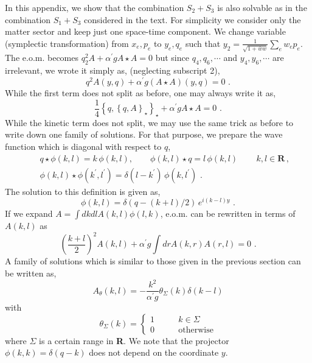 \documentclass[a4paper,aps,preprint,nofootinbib,eqsecnum]{revtex4}
\begin{document}
\label{s:particle_limit}
In this appendix, we show that the combination $S_2+S_3$ is also solvable as
in the combination $S_1+S_3$ considered in the text. For simplicity we
consider only the matter sector and keep just one space-time component. We
change variable (symplectic transformation) from $x_e,p_e$ to $y_e,q_e$ such
that $y_2=\frac{1}{\sqrt{1+\bar w w}}\sum_e w_e p_e$. The e.o.m. becomes $%
q_2^2A+{\alpha^{\prime}} g A\star A=0$ but since $q_4, q_6,\cdots$ and $y_4,
y_6,\cdots$ are irrelevant, we wrote it simply as, (neglecting subscript 2),
\begin{equation}
q^2A(y,q)+{\alpha^{\prime}} g (A\star A)(y,q)=0\,\,.
\end{equation}
While the first term does not split as before, one may always write it as,
\begin{equation}
\frac{1}{4}\left\{q,\left\{q,A\right\}_\star\right\}_\star +{\alpha^{\prime}}
g A\star A=0\,\,.
\end{equation}
While the kinetic term does not split, we may use the same trick as before
to write down one family of solutions. For that purpose, we prepare the wave
function which is diagonal with respect to $q$,
\begin{eqnarray}
&&q\star\phi(k,l)=k \,\phi(k,l),\qquad \phi(k,l)\star q=l
\,\phi(k,l)\,\qquad k,l\in{\mathbf{R}} \,, \\
&& \phi(k,l)\star
\phi(k^{\prime},l^{\prime})=\delta(l-k^{\prime})\,\phi(k,l^{\prime})\,\,.
\end{eqnarray}
The solution to this definition is given as,
\begin{equation}
\phi(k,l)=\delta\left(q-(k+l)/{2}\right)\,e^{i(k-l)y}\,\,.
\end{equation}
If we expand $A=\int dk dl A(k,l) \phi(l,k)$, e.o.m. can be rewritten in
terms of $A(k,l)$ as
\begin{equation}
\left(\frac{k+l}{2}\right)^2 A(k,l)+{\alpha^{\prime}} g \int dr
A(k,r)A(r,l)=0\,\,.
\end{equation}
A family of solutions which is similar to those given in the previous
section can be written as,
\begin{equation}
A_\theta(k,l) = -\frac{k^2}{{\alpha^{\prime}} g } \theta_\Sigma (k)
\delta(k-l)
\end{equation}
with
\begin{equation}
\theta_\Sigma(k) =\left\{%
\begin{array}{ll}
1 \qquad & k\in \Sigma \\
0 \qquad & \mbox{otherwise}%
\end{array}%
\right.
\end{equation}
where $\Sigma$ is a certain range in \textbf{R}. We note that the
projector $\phi(k,k)=\delta(q-k)$ does not depend on the coordinate $y$.
\end{document}

